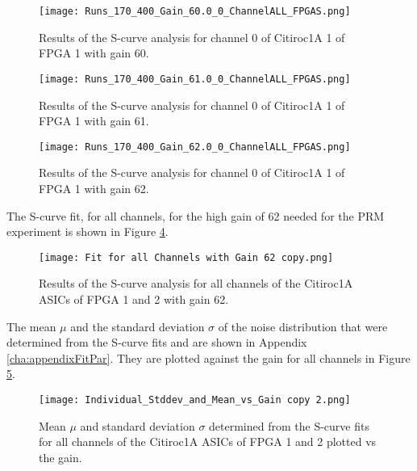     \begin{figure}[H]
        \centering
        \texttt{[image: Runs\_170\_400\_Gain\_60.0\_0\_ChannelALL\_FPGAS.png]}
        \caption{Results of the S-curve analysis for channel 0 of Citiroc1A 1 of FPGA 1 with gain 60.}
        \label{fig:S_curve_60}
    \end{figure}
    \begin{figure}[H]
        \centering
        \texttt{[image: Runs\_170\_400\_Gain\_61.0\_0\_ChannelALL\_FPGAS.png]}
        \caption{Results of the S-curve analysis for channel 0 of Citiroc1A 1 of FPGA 1 with gain 61.}
        \label{fig:S_curve_61}
    \end{figure}
    \begin{figure}[H]
        \centering
        \texttt{[image: Runs\_170\_400\_Gain\_62.0\_0\_ChannelALL\_FPGAS.png]}
        \caption{Results of the S-curve analysis for channel 0 of Citiroc1A 1 of FPGA 1 with gain 62.}
        \label{fig:S_curve_62}
    \end{figure}
    The S-curve fit, for all channels, for the high gain of 62 needed for the PRM experiment is shown in Figure \ref{fig:S_curve_62_ALL}. 
    
    \begin{figure}[H]
        \centering
        \texttt{[image: Fit for all Channels with Gain 62 copy.png]}
        \caption{Results of the S-curve analysis for all channels of the Citiroc1A ASICs of FPGA 1 and 2 with gain 62.}
        \label{fig:S_curve_62_ALL}
    \end{figure}
    The mean $\mu$ and the standard deviation $\sigma$ of the noise distribution that were determined from the S-curve fits and are shown in Appendix \ref{cha:appendixFitPar}.
    They are plotted against the gain for all channels in Figure \ref{fig:Mean vs gain}.
    \begin{figure}[H]
        \centering
        \texttt{[image: Individual\_Stddev\_and\_Mean\_vs\_Gain copy 2.png]}
        \caption{Mean $\mu$ and standard deviation $\sigma$ determined from the S-curve fits for all channels of the Citiroc1A ASICs of FPGA 1 and 2 plotted vs the gain.}
        \label{fig:Mean vs gain}
    \end{figure}
    
